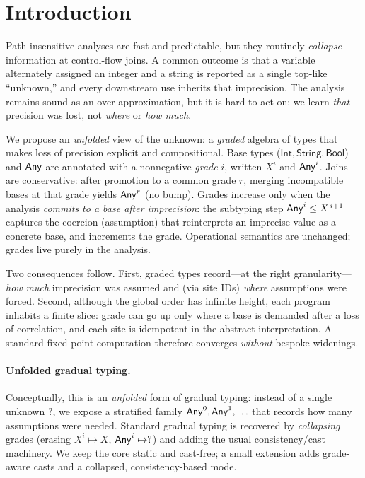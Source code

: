 \section{Introduction}

Path-insensitive analyses are fast and predictable, but they routinely \emph{collapse} information at control-flow joins.
A common outcome is that a variable alternately assigned an integer and a string is reported as a single top-like ``unknown,'' and every downstream use inherits that imprecision.
The analysis remains sound as an over-approximation, but it is hard to act on: we learn \emph{that} precision was lost, not \emph{where} or \emph{how much}.

We propose an \emph{unfolded} view of the unknown: a \emph{graded} algebra of types that makes loss of precision explicit and compositional.
Base types (\(\mathsf{Int},\mathsf{String},\mathsf{Bool}\)) and \(\mathsf{Any}\) are annotated with a nonnegative \emph{grade} \(i\), written \(X^{i}\) and \(\mathsf{Any}^{i}\).
Joins are conservative: after promotion to a common grade \(r\), merging incompatible bases at that grade yields \(\mathsf{Any}^{r}\) (no bump).
Grades increase only when the analysis \emph{commits to a base after imprecision}:
the subtyping step \(\mathsf{Any}^{i} \le X^{\,i+1}\) captures the coercion (assumption) that reinterprets an imprecise value as a concrete base, and increments the grade.
Operational semantics are unchanged; grades live purely in the analysis.

Two consequences follow.
First, graded types record—at the right granularity—\emph{how much} imprecision was assumed and (via site IDs) \emph{where} assumptions were forced.
Second, although the global order has infinite height, each program inhabits a finite slice:
grade can go up only where a base is demanded after a loss of correlation, and each site is idempotent in the abstract interpretation.
A standard fixed-point computation therefore converges \emph{without} bespoke widenings.

\paragraph{Unfolded gradual typing.}
Conceptually, this is an \emph{unfolded} form of gradual typing: instead of a single unknown \(?\), we expose a stratified family \(\mathsf{Any}^{0},\mathsf{Any}^{1},\ldots\) that records how many assumptions were needed.
Standard gradual typing is recovered by \emph{collapsing} grades (erasing \(X^{i}\mapsto X\), \(\mathsf{Any}^{i}\mapsto ?\)) and adding the usual consistency/cast machinery.
We keep the core static and cast-free; a small extension adds grade-aware casts and a collapsed, consistency-based mode.

